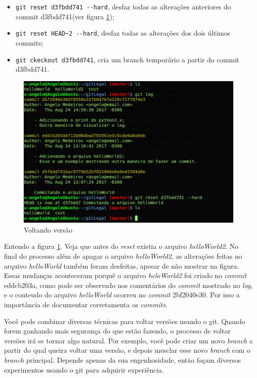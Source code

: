 \documentclass[12pt,openright,oneside,a4paper,english,brazil]{abntex2}
\begin{document}
\begin{itemize}
	\item \verb|git reset d3fbdd741 --hard|, desfaz todas as alterações anteriores do commit d3fbdd741(ver figura \ref{voltando});
	\item \verb|git reset HEAD~2 --hard|, desfaz todas as alterações dos dois últimos commits;
	\item \verb|git ckeckout d3fbdd741|, cria um branch temporário a partir do commit d3fbdd741.
\end{itemize}

\begin{figure}[h]
	\caption{\label{voltando}Voltando versão}
	\begin{center}
		\includegraphics[width=1\linewidth]{voltando}
	\end{center}
\end{figure}

Entendo a figura \ref{voltando}. Veja que antes do \textit{reset} existia o arquivo \textit{helloWorld2}. No final do processo além de apagar o arquivo \textit{helloWorld2}, as alterações feitas no arquivo \textit{helloWorld} também foram desfeitas, apesar de não mostrar na figura. Essas mudanças aconteceram porquê o arquivo \textit{heloWorld2} foi criado no \textit{commit} eddcb203a, como pode ser observado nos comentários do \textit{commit} mostrado no \textit{log}, e o conteudo do arquivo \textit{helloWorld} ocorreu no \textit{commit} 2bf2040e30. Por isso a importância de documentar corretamenta os \textit{commits}.

Você pode combinar diversas técnicas para voltar versões usando o git. Quando forem ganhando mais segurança do que estão fazendo, o processo de voltar versões irá se tornar algo natural. Por exemplo, você pode criar um novo \textit{branch} a partir do qual queira voltar uma versão, e depois mesclar esse novo \textit{branch} com o \textit{branch} principal. Depende apenas da sua engenhosidade, então façam diversos experimentos usando o git para adquirir experiência.
\end{document}
